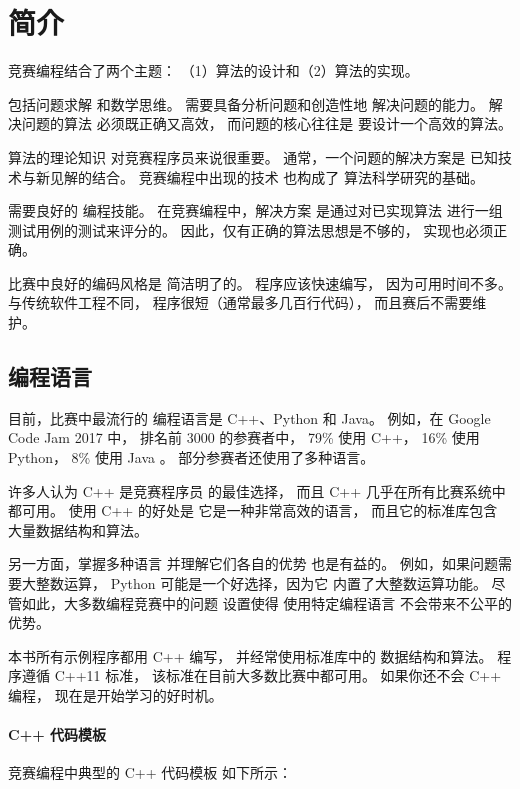 \chapter{简介}

竞赛编程结合了两个主题：
（1）算法的设计和（2）算法的实现。

包括问题求解
和数学思维。
需要具备分析问题和创造性地
解决问题的能力。
解决问题的算法
必须既正确又高效，
而问题的核心往往是
要设计一个高效的算法。

算法的理论知识
对竞赛程序员来说很重要。
通常，一个问题的解决方案是
已知技术与新见解的结合。
竞赛编程中出现的技术
也构成了
算法科学研究的基础。

需要良好的
编程技能。
在竞赛编程中，解决方案
是通过对已实现算法
进行一组测试用例的测试来评分的。
因此，仅有正确的算法思想是不够的，
实现也必须正确。

比赛中良好的编码风格是
简洁明了的。
程序应该快速编写，
因为可用时间不多。
与传统软件工程不同，
程序很短（通常最多几百行代码），
而且赛后不需要维护。

\section{编程语言}


目前，比赛中最流行的
编程语言是 C++、Python 和 Java。
例如，在 Google Code Jam 2017 中，
排名前 3000 的参赛者中，
79\% 使用 C++，
16\% 使用 Python，
8\% 使用 Java \cite{goo17}。
部分参赛者还使用了多种语言。

许多人认为 C++ 是竞赛程序员
的最佳选择，
而且 C++ 几乎在所有比赛系统中都可用。
使用 C++ 的好处是
它是一种非常高效的语言，
而且它的标准库包含
大量数据结构和算法。

另一方面，掌握多种语言
并理解它们各自的优势
也是有益的。
例如，如果问题需要大整数运算，
Python 可能是一个好选择，因为它
内置了大整数运算功能。
尽管如此，大多数编程竞赛中的问题
设置使得
使用特定编程语言
不会带来不公平的优势。

本书所有示例程序都用 C++ 编写，
并经常使用标准库中的
数据结构和算法。
程序遵循 C++11 标准，
该标准在目前大多数比赛中都可用。
如果你还不会 C++ 编程，
现在是开始学习的好时机。

\subsubsection{C++ 代码模板}

竞赛编程中典型的 C++ 代码模板
如下所示：

